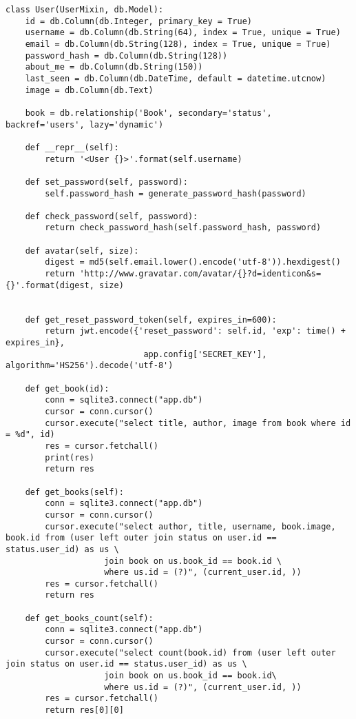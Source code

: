 \begin{lstlisting}[label=some-code, caption=Класс <<Пользователи>>]
class User(UserMixin, db.Model):
    id = db.Column(db.Integer, primary_key = True)
    username = db.Column(db.String(64), index = True, unique = True)
    email = db.Column(db.String(128), index = True, unique = True)
    password_hash = db.Column(db.String(128))
    about_me = db.Column(db.String(150))
    last_seen = db.Column(db.DateTime, default = datetime.utcnow)
    image = db.Column(db.Text)

    book = db.relationship('Book', secondary='status', backref='users', lazy='dynamic')

    def __repr__(self):
        return '<User {}>'.format(self.username)

    def set_password(self, password):
        self.password_hash = generate_password_hash(password)

    def check_password(self, password):
        return check_password_hash(self.password_hash, password)

    def avatar(self, size):
        digest = md5(self.email.lower().encode('utf-8')).hexdigest()
        return 'http://www.gravatar.com/avatar/{}?d=identicon&s={}'.format(digest, size)


    def get_reset_password_token(self, expires_in=600):
        return jwt.encode({'reset_password': self.id, 'exp': time() + expires_in},
                            app.config['SECRET_KEY'], algorithm='HS256').decode('utf-8')

    def get_book(id):
        conn = sqlite3.connect("app.db")
        cursor = conn.cursor()
        cursor.execute("select title, author, image from book where id = %d", id)
        res = cursor.fetchall()
        print(res)
        return res

    def get_books(self):
        conn = sqlite3.connect("app.db")
        cursor = conn.cursor()
        cursor.execute("select author, title, username, book.image, book.id from (user left outer join status on user.id == status.user_id) as us \
                    join book on us.book_id == book.id \
                    where us.id = (?)", (current_user.id, ))
        res = cursor.fetchall()
        return res

    def get_books_count(self):
        conn = sqlite3.connect("app.db")
        cursor = conn.cursor()
        cursor.execute("select count(book.id) from (user left outer join status on user.id == status.user_id) as us \
                    join book on us.book_id == book.id\
                    where us.id = (?)", (current_user.id, ))
        res = cursor.fetchall()
        return res[0][0]
\end{lstlisting}

